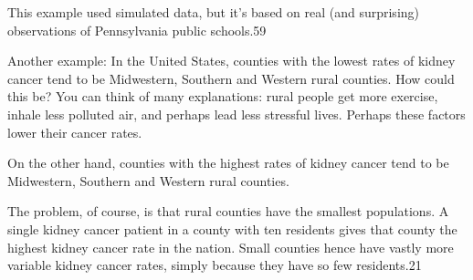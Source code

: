 This example used simulated data, but it’s based on real (and surprising) observations of Pennsylvania public schools.59

Another example: In the United States, counties with the lowest rates of kidney cancer tend to be Midwestern, Southern and Western rural counties. How could this be? You can think of many explanations: rural people get more exercise, inhale less polluted air, and perhaps lead less stressful lives. Perhaps these factors lower their cancer rates.

On the other hand, counties with the highest rates of kidney cancer tend to be Midwestern, Southern and Western rural counties.

The problem, of course, is that rural counties have the smallest populations. A single kidney cancer patient in a county with ten residents gives that county the highest kidney cancer rate in the nation. Small counties hence have vastly more variable kidney cancer rates, simply because they have so few residents.21

